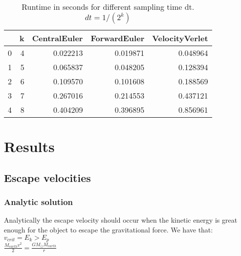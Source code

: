 \FloatBarrier
\begin{table}

\begin{tabular}{lrrrr}
\toprule
{} &  k &  CentralEuler &  ForwardEuler &  VelocityVerlet \\
\midrule
0 &  4 &      0.022213 &      0.019871 &        0.048964 \\
1 &  5 &      0.065837 &      0.048205 &        0.128394 \\
2 &  6 &      0.109570 &      0.101608 &        0.188569 \\
3 &  7 &      0.267016 &      0.214553 &        0.437121 \\
4 &  8 &      0.404209 &      0.396895 &        0.856961 \\
\bottomrule

\end{tabular}

\caption{Runtime in seconds for different sampling time dt. $dt = 1/(2^k)$}
\label{tab:Timing_differences_FLOPS}
\end{table}
\FloatBarrier


 

\section{Results}



\subsection{Escape velocities}
\subsubsection{Analytic solution}
Analytically the escape velocity should occur when the kinetic energy is great enough for the object to escape the gravitational force. We have that:\\

$v_{crit} = E_k>E_p$\\

$\frac{M_{earth}v^2}{2} = \frac{GM_{\odot}M_{earth}}{r}$\\

